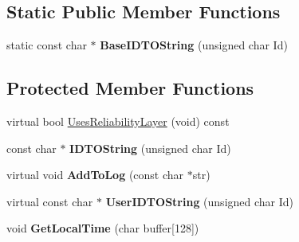 \subsection*{Static Public Member Functions}
\begin{DoxyCompactItemize}
\item 
\hypertarget{class_rak_net_1_1_packet_logger_a1ea5a094f5c433e0d10419c5bfba0977}{static const char $\ast$ {\bfseries Base\-I\-D\-T\-O\-String} (unsigned char Id)}\label{class_rak_net_1_1_packet_logger_a1ea5a094f5c433e0d10419c5bfba0977}

\end{DoxyCompactItemize}
\subsection*{Protected Member Functions}
\begin{DoxyCompactItemize}
\item 
virtual bool \hyperlink{class_rak_net_1_1_packet_logger_ab486d35c408ffee7d1732678143d4a81}{Uses\-Reliability\-Layer} (void) const 
\item 
\hypertarget{class_rak_net_1_1_packet_logger_a46700c39ac30533daced3a11bbc672d9}{const char $\ast$ {\bfseries I\-D\-T\-O\-String} (unsigned char Id)}\label{class_rak_net_1_1_packet_logger_a46700c39ac30533daced3a11bbc672d9}

\item 
\hypertarget{class_rak_net_1_1_packet_logger_aa253a615de429ba330bb8f3c899ec261}{virtual void {\bfseries Add\-To\-Log} (const char $\ast$str)}\label{class_rak_net_1_1_packet_logger_aa253a615de429ba330bb8f3c899ec261}

\item 
\hypertarget{class_rak_net_1_1_packet_logger_a0c4b5188a37b70708603f3d12069dd54}{virtual const char $\ast$ {\bfseries User\-I\-D\-T\-O\-String} (unsigned char Id)}\label{class_rak_net_1_1_packet_logger_a0c4b5188a37b70708603f3d12069dd54}

\item 
\hypertarget{class_rak_net_1_1_packet_logger_af7f4e93aa5befb7f4f9c5ef1b6c44c82}{void {\bfseries Get\-Local\-Time} (char buffer\mbox{[}128\mbox{]})}\label{class_rak_net_1_1_packet_logger_af7f4e93aa5befb7f4f9c5ef1b6c44c82}

\end{DoxyCompactItemize}
